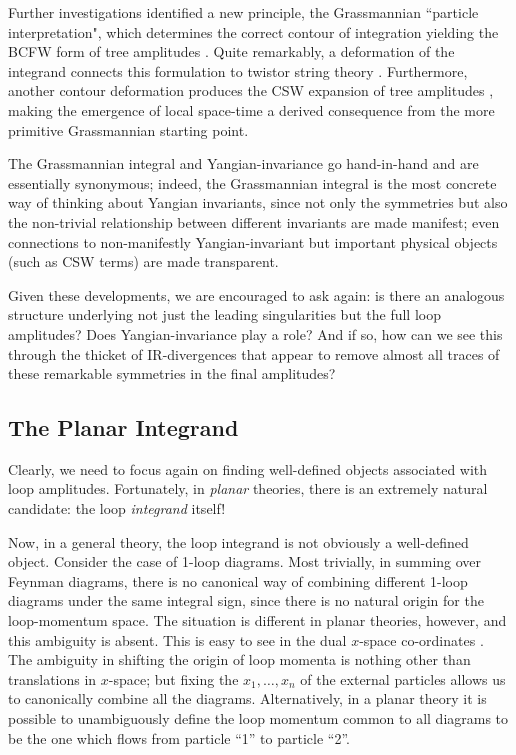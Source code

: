 \documentclass[11pt, reqno]{article}
\begin{document}
Further investigations \cite{ArkaniHamed:2009dg} identified a new principle, the Grassmannian ``particle interpretation", which determines the correct contour of integration yielding the BCFW form of tree amplitudes \cite{Drummond:2008cr}. Quite remarkably, a deformation of the integrand connects this formulation to twistor string theory \cite{NVW, ArkaniHamed:2009dg, Bourjaily:2010kw}. Furthermore, another contour deformation produces the CSW expansion of tree amplitudes \cite{ArkaniHamed:2009sx}, making the emergence of local space-time a derived consequence from the more primitive Grassmannian starting point.

The Grassmannian integral and Yangian-invariance go hand-in-hand and are essentially synonymous; indeed, the Grassmannian integral is the most concrete way of thinking about Yangian invariants, since not only the symmetries but also the non-trivial relationship between different invariants are made manifest; even connections to non-manifestly Yangian-invariant but important physical objects (such as CSW terms) are made transparent.

Given these developments, we are encouraged to ask again: is there an analogous structure underlying not just the leading singularities but the full loop amplitudes? Does Yangian-invariance play a role? And if so, how can we see this through the thicket of IR-divergences that appear to remove almost all traces of these remarkable symmetries in the final amplitudes?


\newpage
\subsection{The Planar Integrand}

Clearly, we need to focus again on finding well-defined objects associated with loop amplitudes. Fortunately, in {\it planar} theories, there is an extremely natural candidate: the loop {\it integrand} itself!

Now, in a general theory, the loop integrand is not obviously a well-defined object. Consider the case of 1-loop diagrams. Most trivially, in
summing over Feynman diagrams, there is no canonical way of
combining different 1-loop diagrams under the same integral sign, since
there is no natural origin for the loop-momentum space. The
situation is different in planar theories, however, and this ambiguity is
absent. This is easy to see in the dual $x$-space co-ordinates \cite{Drummond:2006rz}. The
ambiguity in shifting the origin of loop momenta is nothing other
than translations in $x$-space; but fixing the $x_1, \ldots, x_n$
of the external particles allows us to canonically combine all the
diagrams. Alternatively, in a planar theory it is possible to unambiguously define the loop momentum common to all diagrams to be the one which flows from particle ``1'' to particle ``2''.
\end{document}
